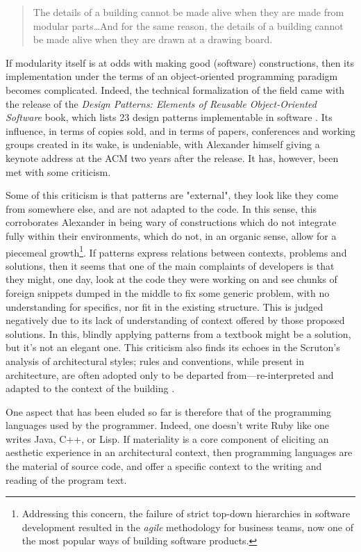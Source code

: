 \begin{quote}
    The details of a building cannot be made alive when they are made from modular parts\dots And for the same reason, the details of a building cannot be made alive when they are drawn at a drawing board. \citep{alexander_timeless_1979}
\end{quote}

If modularity itself is at odds with making good (software) constructions, then its implementation under the terms of an object-oriented programming paradigm becomes complicated. Indeed, the technical formalization of the field came with the release of the \emph{Design Patterns: Elements of Reusable Object-Oriented Software} book, which lists 23 design patterns implementable in software \citep{gamma_design_1994}. Its influence, in terms of copies sold, and in terms of papers, conferences and working groups created in its wake, is undeniable, with Alexander himself giving a keynote address at the ACM two years after the release. It has, however, been met with some criticism.

Some of this criticism is that patterns are "external", they look like they come from somewhere else, and are not adapted to the code. In this sense, this corroborates Alexander in being wary of constructions which do not integrate fully within their environments, which do not, in an organic sense, allow for a piecemeal growth\footnote{Addressing this concern, the failure of strict top-down hierarchies in software development resulted in the \emph{agile} methodology for business teams, now one of the most popular ways of building software products.}. If patterns express relations between contexts, problems and solutions, then it seems that one of the main complaints of developers is that they might, one day, look at the code they were working on and see chunks of foreign snippets dumped in the middle to fix some generic problem, with no understanding for specifics, nor fit in the existing structure. This is judged negatively due to its lack of understanding of context offered by those proposed solutions. In this, blindly applying patterns from a textbook might be a solution, but it's not an elegant one. This criticism also finds its echoes in the Scruton's analysis of architectural styles; rules and conventions, while present in architecture, are often adopted only to be departed from—re-interpreted and adapted to the context of the building \citep{scruton_aesthetics_2013}.

One aspect that has been eluded so far is therefore that of the programming languages used by the programmer. Indeed, one doesn't write Ruby like one writes Java,  C++, or Lisp. If materiality is a core component of eliciting an aesthetic experience in an architectural context, then programming languages are the material of source code, and offer a specific context to the writing and reading of the program text.

